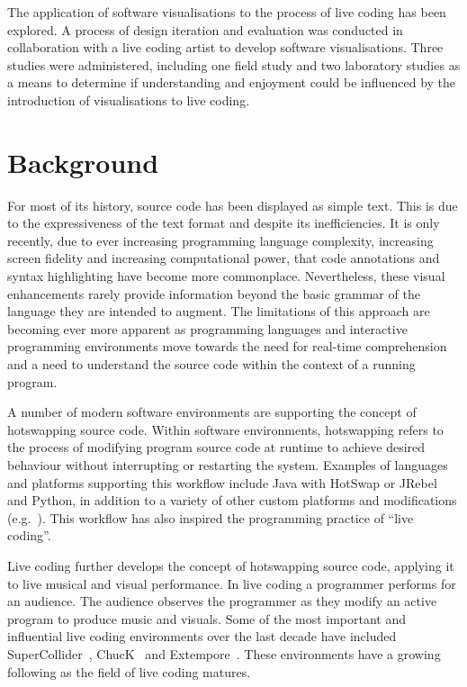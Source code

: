 The application of software visualisations to the process of live coding has been explored. A process of design iteration and evaluation was conducted in collaboration with a live coding  artist to develop software visualisations. Three studies were administered, including one field study and two laboratory studies as a means to determine if understanding and enjoyment could be influenced by the introduction of visualisations to live coding.

\section{Background}

For most of its history, source code has been displayed as simple text. This is due to the expressiveness of the text format and despite its inefficiencies. It is only recently, due to ever increasing programming language complexity, increasing screen fidelity and increasing computational power, that code annotations and syntax highlighting have become more commonplace. Nevertheless, these visual enhancements rarely provide information beyond the basic grammar of the language they are intended to augment. The limitations of this approach are becoming ever more apparent as programming languages and interactive programming environments move towards the need for real-time comprehension and a need to understand the source code within the context of a running program.

A number of modern software environments are supporting the concept of hotswapping source code. Within software environments, hotswapping refers to the process of modifying program source code at runtime to achieve desired behaviour without interrupting or restarting the system. Examples of languages and platforms supporting this workflow include Java with HotSwap or JRebel~\cite{ZeroTurnaround2014} and Python, in addition to a variety of other custom platforms and modifications (e.g.~\cite{Thomas2011}). This workflow has also inspired the programming practice of ``live coding''. 

Live coding further develops the concept of hotswapping source code, applying it to live musical and visual performance. In live coding a programmer performs for an audience. The audience observes the programmer as they modify an active program to produce music and visuals. Some of the most important and influential live coding environments over the last decade have included SuperCollider~\cite{McCartney}, ChucK~\cite{Wang2008} and Extempore~\cite{Sorensen}. These environments have a growing following as the field of live coding matures.

